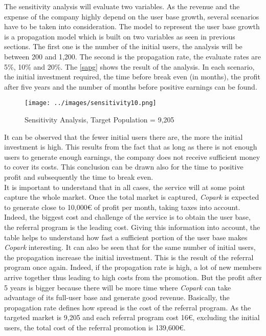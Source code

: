 \documentclass[12pt,a4paper,oneside]{book}
\newcommand{\bp}{\textit{Copark}}
\begin{document}
The sensitivity analysis will evaluate two variables. As the revenue and the expense of the company highly depend on the user base growth, several scenarios have to be taken into consideration. The model to represent the user base growth is a propagation model which is built on two variables as seen in previous sections. The first one is the number of the initial users, the analysis will be between 200 and 1,200. The second is the propagation rate, the evaluate rates are 5\%, 10\% and 20\%. The \autoref{sapg} shows the result of the analysis. In each scenario, the initial investment required, the time before break even (in months), the profit after five years and the number of months before positive earnings can be found.\\

\begin{figure}[h]
\centering
\caption{Sensitivity Analysis, Target Population = 9,205}
\label{sapg}
\texttt{[image: ../images/sensitivity10.png]}
\end{figure}

It can be observed that the fewer initial users there are, the more the initial investment is high. This results from the fact that as long as there is not enough users to generate enough earnings, the company does not receive sufficient money to cover its costs. This conclusion can be drawn also for the time to positive profit and subsequently the time to break even.\\

It is important to understand that in all cases, the service will at some point capture the whole market. Once the total market is captured, \bp{} is expected to generate close to 10,000\euro{} of profit per month, taking taxes into account. Indeed, the biggest cost and challenge of the service is to obtain the user base, the referral program is the leading cost. Giving this information into account, the table helps to understand how fast a sufficient portion of the user base makes \bp{} interesting. It can also be seen that for the same number of initial users, the propagation increase the initial investment. This is the result of the referral program once again. Indeed, if the propagation rate is high, a lot of  new members arrive together thus leading to high costs from the promotion. But the profit after 5 years is bigger because there will be more time where \bp{} can take advantage of its full-user base and generate good revenue. Basically, the propagation rate defines how spread is the cost of the referral program. As the targeted market is 9,205 and each referral program cost 16\euro{}, excluding the initial users, the total cost of the referral promotion is 139,600\euro{}.\\
\end{document}
